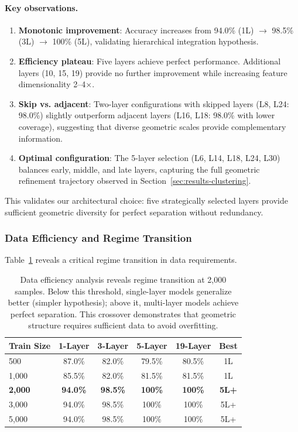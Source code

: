 \documentclass[11pt]{article}
\begin{document}
\paragraph{Key observations.}
\begin{enumerate}
\item \textbf{Monotonic improvement}: Accuracy increases from 94.0\% (1L) $\to$ 98.5\% (3L) $\to$ 100\% (5L), validating hierarchical integration hypothesis.

\item \textbf{Efficiency plateau}: Five layers achieve perfect performance. Additional layers (10, 15, 19) provide no further improvement while increasing feature dimensionality 2--4$\times$.

\item \textbf{Skip vs. adjacent}: Two-layer configurations with skipped layers (L8, L24: 98.0\%) slightly outperform adjacent layers (L16, L18: 98.0\% with lower coverage), suggesting that diverse geometric scales provide complementary information.

\item \textbf{Optimal configuration}: The 5-layer selection (L6, L14, L18, L24, L30) balances early, middle, and late layers, capturing the full geometric refinement trajectory observed in Section~\ref{sec:results-clustering}.
\end{enumerate}

This validates our architectural choice: five strategically selected layers provide sufficient geometric diversity for perfect separation without redundancy.

\subsubsection{Data Efficiency and Regime Transition}

Table~\ref{tab:ablation-data} reveals a critical regime transition in data requirements.

\begin{table}[h]
\centering
\caption{Data efficiency analysis reveals regime transition at 2,000 samples. Below this threshold, single-layer models generalize better (simpler hypothesis); above it, multi-layer models achieve perfect separation. This crossover demonstrates that geometric structure requires sufficient data to avoid overfitting.}
\label{tab:ablation-data}
\begin{tabular}{lccccc}
\toprule
Train Size & 1-Layer & 3-Layer & 5-Layer & 19-Layer & Best \\
\midrule
500 & 87.0\% & 82.0\% & 79.5\% & 80.5\% & 1L \\
1,000 & 85.5\% & 82.0\% & 81.5\% & 81.5\% & 1L \\
\textbf{2,000} & \textbf{94.0\%} & \textbf{98.5\%} & \textbf{100\%} & \textbf{100\%} & \textbf{5L+} \\
3,000 & 94.0\% & 98.5\% & 100\% & 100\% & 5L+ \\
5,000 & 94.0\% & 98.5\% & 100\% & 100\% & 5L+ \\
\bottomrule
\end{tabular}
\end{table}
\end{document}
